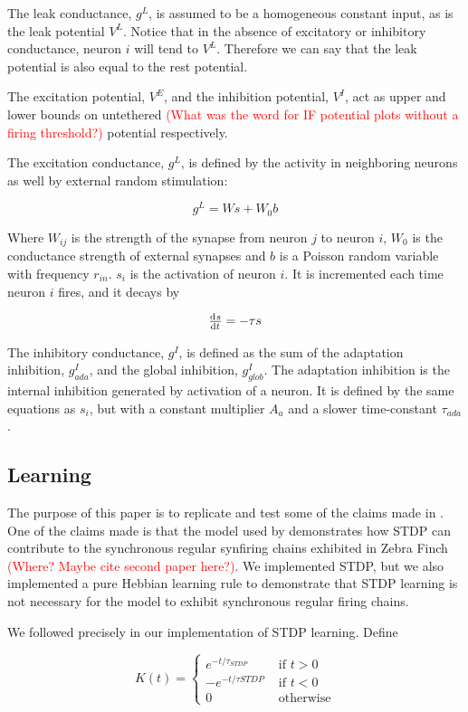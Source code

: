 \documentclass[12pt, final]{article}
\begin{document}
The leak conductance, \(g^L\), is assumed to be a homogeneous constant input, as is the leak potential \(V^L\). Notice that in the absence of excitatory or inhibitory conductance, neuron \(i\) will tend to \(V^L\). Therefore we can say that the leak potential is also equal to the rest potential.

The excitation potential, \(V^E\), and the inhibition potential, \(V^I\), act as upper and lower bounds on untethered \textcolor{red}{(What was the word for IF potential plots without a firing threshold?)} potential respectively. 

The excitation conductance, \(g^L\), is defined by the activity in neighboring neurons as well by external random stimulation:

\[g^L = Ws + W_0b\]

Where \(W_{ij}\) is the strength of the synapse from neuron \(j\) to neuron \(i\), \(W_0\) is the conductance strength of external synapses and \(b\) is a Poisson random variable with frequency \(r_{in}\). \(s_i\) is the activation of neuron \(i\). It is incremented each time neuron \(i\) fires, and it decays by

\[\od{s}{t} = -\tau s\]

The inhibitory conductance, \(g^I\), is defined as the sum of the adaptation inhibition, \(g^I_{ada}\), and the global inhibition, \(g^I_{glob}\). The adaptation inhibition is the internal inhibition generated by activation of a neuron. It is defined by the same equations as \(s_i\), but with a constant multiplier \(A_a\) and a slower time-constant \(\tau_{ada}\).

\subsection{Learning}

The purpose of this paper is to replicate and test some of the claims made in \cite{Fiete}. One of the claims made is that the model used by \cite{Fiete} demonstrates how STDP can contribute to the synchronous regular synfiring chains exhibited in Zebra Finch \textcolor{red}{(Where? Maybe cite second paper here?)}. We implemented STDP, but we also implemented a pure Hebbian learning rule to demonstrate that STDP learning is not necessary for the model to exhibit synchronous regular firing chains.

We followed \cite{Fiete} precisely in our implementation of STDP learning. Define

\[K(t) = 
\begin{cases}
e^{-t/\tau_{STDP}} &\text{ if } t > 0\\
-e^{-t/\tau{STDP}} &\text{ if } t < 0\\
0 &\text{ otherwise}
\end{cases}
\]
\end{document}
